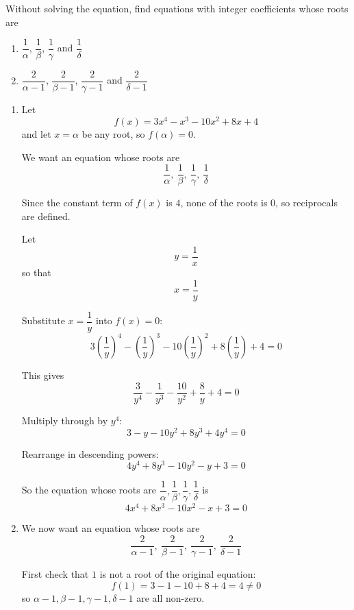 \documentclass[leqno]{article}
\begin{document}
\begin{enumerate}[
  label=\textbf{\arabic*.},
  leftmargin=*,
  topsep=0pt,
  partopsep=0pt,
  parsep=0pt
]
Without solving the equation, find equations with integer coefficients whose roots are \\
\begin{enumerate}[label=\textbf{(\alph*)}]
  \item $\dfrac{1}{\alpha}$, $\dfrac{1}{\beta}$, $\dfrac{1}{\gamma}$ and $\dfrac{1}{\delta}$  \\
  \item $\dfrac{2}{\alpha - 1}$, $\dfrac{2}{\beta - 1}$, $\dfrac{2}{\gamma - 1}$ and $\dfrac{2}{\delta - 1}$  \\
\end{enumerate}

\vspace*{10pt}

\begin{tcolorbox}[colback=white, colframe=scarlet, title={\textbf{Solution}}, breakable, grow to left by=6mm, grow to right by=10mm]
\begin{enumerate}[label=\textbf{(\alph*)}]
  \item Let
\[
f(x)=3x^4-x^3-10x^2+8x+4
\]
and let \(x=\alpha\) be any root, so \(f(\alpha)=0\).

We want an equation whose roots are
\[
\frac1\alpha,\ \frac1\beta,\ \frac1\gamma,\ \frac1\delta
\]

Since the constant term of \(f(x)\) is \(4\), none of the roots is \(0\), so reciprocals are defined.

Let
\[
y=\frac1x
\]
so that
\[
x=\frac1y
\]

Substitute \(x=\dfrac1y\) into \(f(x)=0\):
\[
3\left(\frac1y\right)^4-\left(\frac1y\right)^3-10\left(\frac1y\right)^2+8\left(\frac1y\right)+4=0
\]

This gives
\[
\frac{3}{y^4}-\frac{1}{y^3}-\frac{10}{y^2}+\frac{8}{y}+4=0
\]

Multiply through by \(y^4\):
\[
3-y-10y^2+8y^3+4y^4=0
\]

Rearrange in descending powers:
\[
4y^4+8y^3-10y^2-y+3=0
\]

So the equation whose roots are
\(\dfrac1\alpha,\dfrac1\beta,\dfrac1\gamma,\dfrac1\delta\) is
\[
4x^4+8x^3-10x^2-x+3=0
\]

  \item We now want an equation whose roots are
\[
\frac{2}{\alpha-1},\ \frac{2}{\beta-1},\ \frac{2}{\gamma-1},\ \frac{2}{\delta-1}
\]

First check that \(1\) is not a root of the original equation:
\[
f(1)=3-1-10+8+4=4\neq 0
\]
so \(\alpha-1,\beta-1,\gamma-1,\delta-1\) are all non-zero.


\end{enumerate}
\end{tcolorbox}
\end{enumerate}
\end{document}
